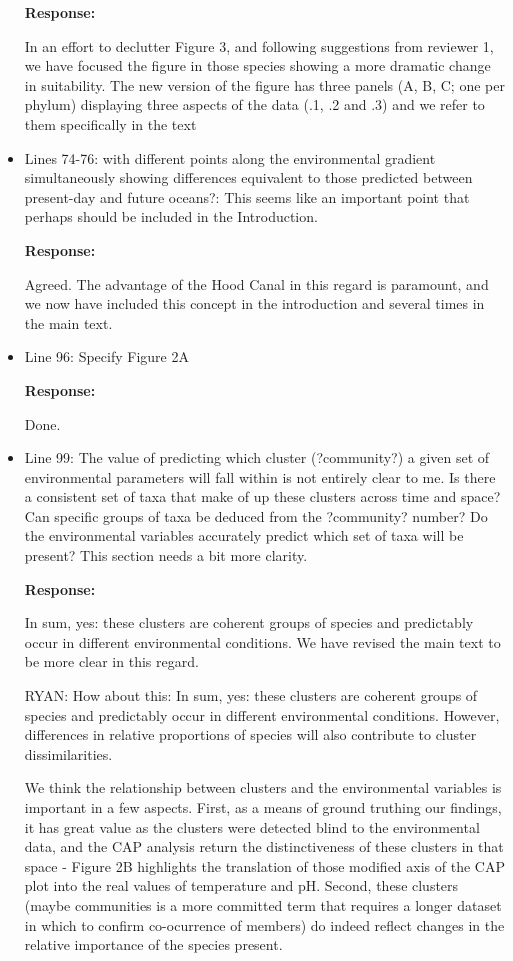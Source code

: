 \documentclass[11pt]{article}
\begin{document}
\begin{linenumbers}
\begin{itemize}
\textbf{Response:}

In an effort to declutter Figure 3, and following suggestions from reviewer 1, we have focused the figure in those species showing a more dramatic change in suitability. The new version of the figure has three panels (A, B, C; one per phylum) displaying three aspects of the data (.1, .2 and .3) and we refer to them specifically in the text

\item{Lines 74-76: with different points along the environmental gradient simultaneously showing differences equivalent to those predicted between present-day and future oceans?: This seems like an important point that perhaps should be included in the Introduction.}

\textbf{Response:}

Agreed. The advantage of the Hood Canal in this regard is paramount, and we now have included this concept in the introduction and several times in the main text.

\item{Line 96: Specify Figure 2A}

\textbf{Response:}

Done.

\item{Line 99: The value of predicting which cluster (?community?) a given set of environmental parameters will fall within is not entirely clear to me. Is there a consistent set of taxa that make of up these clusters across time and space? Can specific groups of taxa be deduced from the ?community? number? Do the environmental variables accurately predict which set of taxa will be present? This section needs a bit more clarity.}

\textbf{Response:}

In sum, yes: these clusters are coherent groups of species and predictably occur in different environmental conditions.  We have revised the main text to be more clear in this regard. 

{\color{red}RYAN: How about this:
In sum, yes: these clusters are coherent groups of species and predictably occur in different environmental conditions. However, differences in relative proportions of species will also contribute to cluster dissimilarities. }

We think the relationship between clusters and the environmental variables is important in a few aspects. First, as a means of ground truthing our findings, it has great value as the clusters were detected blind to the environmental data, and the CAP analysis return the distinctiveness of these clusters in that space - Figure 2B highlights the translation of those modified axis of the CAP plot into the real values of temperature and pH. Second, these clusters (maybe communities is a more committed term that requires a longer dataset in which to confirm co-ocurrence of members) do indeed reflect changes in the relative importance of the species present.




\end{itemize}
\end{linenumbers}
\end{document}
